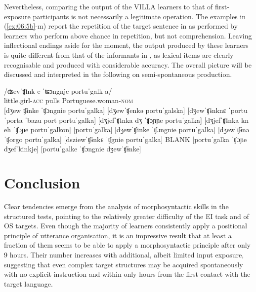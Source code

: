 Nevertheless, comparing the output of the VILLA learners to that of first-exposure participants is not necessarily a legitimate operation. The examples in (\ref{ex:06:5b}-m) report the repetition of the target sentence in  as performed by learners who perform above chance in repetition, but not comprehension. Leaving inflectional endings aside for the moment, the output produced by these learners is quite different from that of the informants in , as lexical items are clearly recognisable and produced with considerable accuracy. The overall picture will be discussed and interpreted in the following  on semi-spontaneous production.

\ea%
    \label{ex:06:5}
    \ea\label{ex:06:5a}
    \gll    /ʥevˈʧɨnk-e   ˈʨɔngnje   portuˈgalk-a/\\
            little.girl-\textsc{acc}   pulls     Portuguese.woman-\textsc{nom}\\
    \ex\label{ex:06:5b}
    [dʒewˈʧɨnke ˈʧɔngnie portuˈgalka]
    \ex\label{ex:06:5c}
    [dʒewˈʧenkə portuˈgalska]
    \ex\label{ex:06:5d}
    [dʒewˈʧɨnknɛ ˈportu ˈporta ˈbazu port portuˈgalka]
    \ex\label{ex:06:5e}
    [dʒjefˈʧɨnka dʒ ˈʧɔɲɲe portuˈgalka]
    \ex\label{ex:06:5f}
    [dʒjefˈʧɨnka kn eh ˈʧɔɲe portuˈgalkon]
    \ex\label{ex:06:5g}
    [portuˈgalka]
    \ex\label{ex:06:5h}
    [dʒewˈʧinke ˈʧɔngnie portuˈgalka]
    \ex\label{ex:06:5i}
    [dʒewˈʧɨnə ˈʧorgo portuˈgalka]
    \ex\label{ex:06:5j}
    [dsziewˈʧɨnkɛ ˈʧgnie portuˈgalka]
    \ex\label{ex:06:5k}
    BLANK
    \ex\label{ex:06:5l}
    [portuˈgalka ˈʧɔɲe dʒefˈkinkje]
    \ex\label{ex:06:5m}
    [portuˈgalke ˈʧɔngnie dʒewˈʧɨnke]
    \z
\z

\section{Conclusion}\label{sec:06:5}

Clear tendencies emerge from the analysis of morphosyntactic skills in the structured tests, pointing to the relatively greater difficulty of the EI task and of OS targets. Even though the majority of learners consistently apply a positional principle of utterance organisation, it is an impressive result that at least a fraction of them seems to be able to apply a morphosyntactic principle after only 9 hours. Their number increases with additional, albeit limited input exposure, suggesting that even complex target structures may be acquired spontaneously with no explicit instruction and within only hours from the first contact with the target language.
